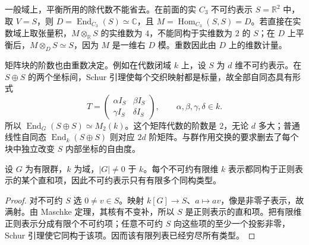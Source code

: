 \ProseParagraphBreak
一般域上，平衡所用的除代数不能省去。在前面的实 \(C_3\) 不可约表示 \(S=\mathbb R^2\) 中，取 \(V=S\)，则 \(D=\operatorname{End}_{C_3}(S)\simeq\mathbb C\)，且 \(M=\operatorname{Hom}_{C_3}(S,S)=D\)。若直接在实数域上取张量积，\(M\otimes_{\mathbb R}S\) 的实维数为 \(4\)，不能同构于实维数为 \(2\) 的 \(S\)；在 \(D\) 上平衡后，\(M\otimes_D S\simeq S\)，因为 \(M\) 是一维右 \(D\) 模。重数因此由 \(D\) 上的维数计量。

\ProseParagraphBreak
矩阵块的阶数也由重数决定。例如在代数闭域 \(k\) 上，设 \(S\) 为 \(d\) 维不可约表示。在 \(S\oplus S\) 的两个坐标间，Schur 引理使每个交织映射都是标量，故全部自同态具有形式
\[
	T=\begin{pmatrix}\alpha I_S&\beta I_S\\\gamma I_S&\delta I_S\end{pmatrix},
	\qquad \alpha,\beta,\gamma,\delta\in k.
\]
所以 \(\operatorname{End}_G(S\oplus S)\simeq M_2(k)\)。这个矩阵代数的阶数是 \(2\)，无论 \(d\) 多大；普通线性自同态 \(\operatorname{End}_k(S\oplus S)\) 则对应 \(2d\) 阶矩阵。与群作用交换的要求删去了每个块中独立改变 \(S\) 内部坐标的自由度。

\begin{lemma}\label{b5:lem:irreducibles-in-regular}
	设 \(G\) 为有限群，\(k\) 为域，\(|G|\ne0\) 于 \(k\)。每个不可约有限维 \(k\) 表示都同构于正则表示的某个直和项，因此不可约表示只有有限多个同构类型。
\end{lemma}
\begin{proof}
	对不可约 \(S\) 选 \(0\ne v\in S\)。映射 \(k[G]\to S\)、\(a\mapsto av\)，像是非零子表示，故满射。由 Maschke 定理，其核有不变补，所以 \(S\) 是正则表示的直和项。把有限维正则表示分成有限个不可约项；任意不可约 \(S\) 向这些项的至少一个投影非零，Schur 引理使它同构于该项。因而该有限列表已经穷尽所有类型。
\end{proof}
